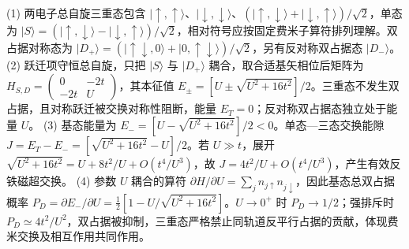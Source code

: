 (1) 两电子总自旋三重态包含 \(|\uparrow,\uparrow\rangle\)、\(|\downarrow,\downarrow\rangle\)、\((|\uparrow,\downarrow\rangle+|\downarrow,\uparrow\rangle)/\sqrt2\)，单态为 \(|S\rangle=(|\uparrow,\downarrow\rangle-|\downarrow,\uparrow\rangle)/\sqrt2\)，相对符号应按固定费米子算符排列理解。双占据对称态为 \(|D_+\rangle=(|\uparrow\downarrow,0\rangle+|0,\uparrow\downarrow\rangle)/\sqrt2\)，另有反对称双占据态 \(|D_-\rangle\)。
(2) 跃迁项守恒总自旋，只把 \(|S\rangle\) 与 \(|D_+\rangle\) 耦合，取合适基矢相位后矩阵为 \(H_{S,D}=\begin{pmatrix}0&-2t\\-2t&U\end{pmatrix}\)，其本征值 \(E_\pm=[U\pm\sqrt{U^2+16t^2}]/2\)。三重态不发生双占据，且对称跃迁被交换对称性阻断，能量 \(E_T=0\)；反对称双占据态独立处于能量 \(U\)。
(3) 基态能量为 \(E_-= [U-\sqrt{U^2+16t^2}]/2<0\)。单态—三态交换能隙 \(J=E_T-E_-=[\sqrt{U^2+16t^2}-U]/2\)。若 \(U\gg t\)，展开 \(\sqrt{U^2+16t^2}=U+8t^2/U+O(t^4/U^3)\)，故 \(J=4t^2/U+O(t^4/U^3)\)，产生有效反铁磁超交换。
(4) 参数 \(U\) 耦合的算符 \(\partial H/\partial U=\sum_jn_{j\uparrow}n_{j\downarrow}\)，因此基态总双占据概率 \(P_D=\partial E_-/\partial U=\frac12[1-U/\sqrt{U^2+16t^2}]\)。\(U\to0^+\) 时 \(P_D\to1/2\)；强排斥时 \(P_D\simeq4t^2/U^2\)，双占据被抑制，三重态严格禁止同轨道反平行占据的贡献，体现费米交换及相互作用共同作用。
